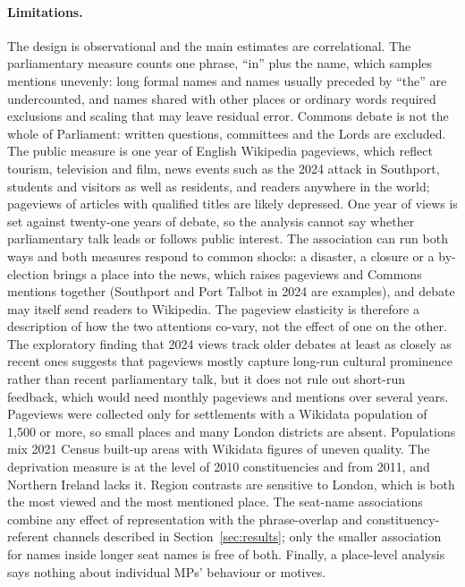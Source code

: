 \documentclass[11pt,a4paper]{article}
\begin{document}
\paragraph{Limitations.} The design is observational and the main estimates are correlational. The parliamentary measure counts one phrase, ``in'' plus the name, which samples mentions unevenly: long formal names and names usually preceded by ``the'' are undercounted, and names shared with other places or ordinary words required exclusions and scaling that may leave residual error. Commons debate is not the whole of Parliament: written questions, committees and the Lords are excluded. The public measure is one year of English Wikipedia pageviews, which reflect tourism, television and film, news events such as the 2024 attack in Southport, students and visitors as well as residents, and readers anywhere in the world; pageviews of articles with qualified titles are likely depressed. One year of views is set against twenty-one years of debate, so the analysis cannot say whether parliamentary talk leads or follows public interest. The association can run both ways and both measures respond to common shocks: a disaster, a closure or a by-election brings a place into the news, which raises pageviews and Commons mentions together (Southport and Port Talbot in 2024 are examples), and debate may itself send readers to Wikipedia. The pageview elasticity is therefore a description of how the two attentions co-vary, not the effect of one on the other. The exploratory finding that 2024 views track older debates at least as closely as recent ones suggests that pageviews mostly capture long-run cultural prominence rather than recent parliamentary talk, but it does not rule out short-run feedback, which would need monthly pageviews and mentions over several years. Pageviews were collected only for settlements with a Wikidata population of 1,500 or more, so small places and many London districts are absent. Populations mix 2021 Census built-up areas with Wikidata figures of uneven quality. The deprivation measure is at the level of 2010 constituencies and from 2011, and Northern Ireland lacks it. Region contrasts are sensitive to London, which is both the most viewed and the most mentioned place. The seat-name associations combine any effect of representation with the phrase-overlap and constituency-referent channels described in Section~\ref{sec:results}; only the smaller association for names inside longer seat names is free of both. Finally, a place-level analysis says nothing about individual MPs' behaviour or motives.
\end{document}
